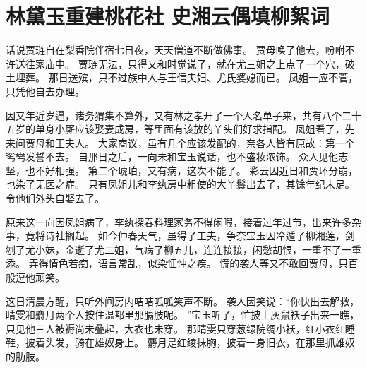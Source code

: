 \chapter{林黛玉重建桃花社 \quad 史湘云偶填柳絮词}
\par
话说贾琏自在梨香院伴宿七日夜，天天僧道不断做佛事。
贾母唤了他去，吩咐不许送往家庙中。
贾琏无法，只得又和时觉说了，就在尤三姐之上点了一个穴，破土埋葬。
那日送殡，只不过族中人与王信夫妇、尤氏婆媳而已。
凤姐一应不管，只凭他自去办理。
\par
因又年近岁逼，诸务猬集不算外，又有林之孝开了一个人名单子来，共有八个二十五岁的单身小厮应该娶妻成房，等里面有该放的丫头们好求指配。
凤姐看了，先来问贾母和王夫人。
大家商议，虽有几个应该发配的，奈各人皆有原故：第一个鸳鸯发誓不去。
自那日之后，一向未和宝玉说话，也不盛妆浓饰。
众人见他志坚，也不好相强。
第二个琥珀，又有病，这次不能了。
彩云因近日和贾环分崩，也染了无医之症。
只有凤姐儿和李纨房中粗使的大丫鬟出去了，其馀年纪未足。
令他们外头自娶去了。
\par
原来这一向因凤姐病了，李纨探春料理家务不得闲暇，接着过年过节，出来许多杂事，竟将诗社搁起。
如今仲春天气，虽得了工夫，争奈宝玉因冷遁了柳湘莲，剑刎了尤小妹，金逝了尤二姐，气病了柳五儿，连连接接，闲愁胡恨，一重不了一重添。
弄得情色若痴，语言常乱，似染怔忡之疾。
慌的袭人等又不敢回贾母，只百般逗他顽笑。
\par
这日清晨方醒，只听外间房内咭咭呱呱笑声不断。
袭人因笑说：“你快出去解救，晴雯和麝月两个人按住温都里那膈肢呢。
”宝玉听了，忙披上灰鼠袄子出来一瞧，只见他三人被褥尚未叠起，大衣也未穿。
那晴雯只穿葱绿院绸小袄，红小衣红睡鞋，披着头发，骑在雄奴身上。
麝月是红绫抹胸，披着一身旧衣，在那里抓雄奴的肋肢。
